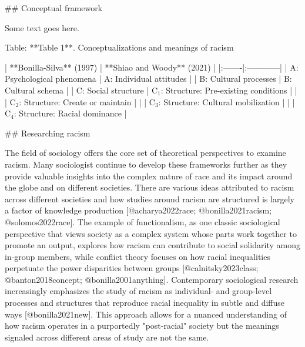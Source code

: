 ## Conceptual framework

Some text goes here.

Table: **Table 1**. Conceptualizations and meanings of racism

| **Bonilla-Silva** (1997) | **Shiao and Woody** (2021)               | 
|:-------|:------------|
| A: Psychological phenomena   | A: Individual attitudes                |
| B: Cultural processes        | B: Cultural schema                     |
| C: Social structure           | C$_1$: Structure: Pre-existing conditions |
|                   | C$_2$: Structure: Create or maintain      |
|                   | C$_3$: Structure: Cultural mobilization                |
|                   | C$_4$: Structure: Racial dominance                 |



## Researching racism

The field of sociology offers the core set of theoretical perspectives to examine racism. Many sociologist continue to develop these frameworks further as they provide valuable insights into the complex nature of race and its impact around the globe and on different societies. There are various ideas attributed to racism across different societies and how studies around racism are structured is largely a factor of knowledge production [@acharya2022race; @bonilla2021racism; @solomos2022race]. The example of functionalism, as one classic sociological perspective that views society as a complex system whose parts work together to promote an output, explores how racism can contribute to social solidarity among in-group members, while conflict theory focuses on how racial inequalities perpetuate the power disparities between groups [@calnitsky2023class; @banton2018concept; @bonilla2001anything]. Contemporary sociological research increasingly emphasizes the study of racism as individual- and group-level processes and structures that reproduce racial inequality in subtle and diffuse ways [@bonilla2021new]. This approach allows for a nuanced understanding of how racism operates in a purportedly "post-racial" society but the meanings signaled across different areas of study are not the same.

